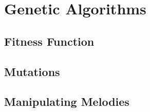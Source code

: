 \chapter{Genetic Algorithms} \label{ga}

\section{Fitness Function} \label{ga:fitness}


\section{Mutations} \label{ga:mutate}


\section{Manipulating Melodies} \label{ga:manip}


